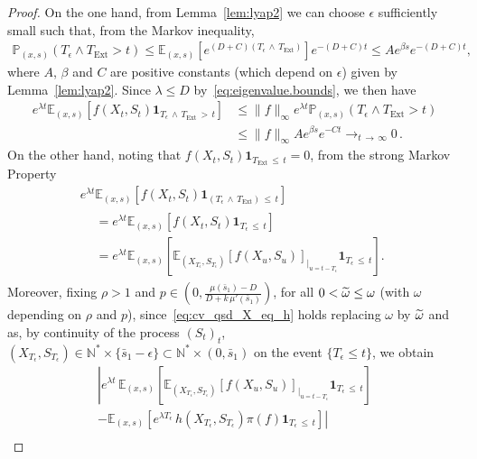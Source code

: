 \documentclass[10pt]{amsart}
\theoremstyle{definition}\newtheorem{defi}[theo]{Definition}\newtheorem{rema}[theo]{Remark}\newtheorem{exam}[theo]{Example}\newtheorem{exem}[theo]{Example}\newtheorem{nota}[theo]{Notation}
\newcommand{\PP}{\mathbb{P}}
\newcommand{\NN}{\mathbb{N}}
\newcommand{\EE}{\mathbb{E}}
\newcommand{\Text}{T_{\mathrm{Ext}}}
\newcommand{\1}{\mathbf{1}}
\let\oldtilde\tilde
\renewcommand*{\tilde}[1]{\mathchoice{\widetilde{#1}}{\widetilde{#1}}{\oldtilde{#1}}{\oldtilde{#1}}}
\begin{document}
\begin{proof}
On the one hand, from Lemma~\ref{lem:lyap2} we can choose $\epsilon$ sufficiently small such that, from the Markov inequality,
\begin{align}\label{eq:proba.T_epsilon}
\PP_{(x,s)}\left(T_\epsilon\wedge \Text >t\right)\leq \EE_{(x,s)}\left[e^{(D+C)\left(T_\epsilon\,\wedge\,\Text\right)} \right] e^{-(D+C)t} \leq A e^{\beta s} e^{-(D+C)t},
\end{align}
where $A$, $\beta$ and $C$ are positive constants (which depend on $\epsilon$) given by Lemma~\ref{lem:lyap2}. Since $\lambda \leq D$ by~\eqref{eq:eigenvalue.bounds}, we then have
\begin{align*}
e^{\lambda t}\EE_{(x,s)}\left[f(X_t,S_t)\1_{T_\epsilon\,\wedge\,\Text\,>\,t}\right] &\leq \|f \|_\infty e^{\lambda t} \PP_{(x,s)}\left(T_\epsilon\wedge \Text>t\right) \\
&\leq \|f \|_\infty A e^{\beta s} e^{-Ct} \longrightarrow_{t\,\to\,\infty} 0\,.
\end{align*}
On the other hand, noting that $f(X_t,S_t)\1_{\Text\,\leq\,t}=0$, from the strong Markov Property
\begin{multline}\label{eq:T_eps_leq_t}
e^{\lambda t}\EE_{(x,s)} \left[f(X_t,S_t)\1_{(T_\epsilon\,\wedge\,\Text)\,\leq\,t}\right]
\\
\begin{aligned}
&=e^{\lambda t}\EE_{(x,s)} \left[f(X_t,S_t)\1_{T_\epsilon\,\leq\,t}\right] \\
&= e^{\lambda t} \EE_{(x,s)} \left[
\EE_{\left(X_{T_\epsilon},S_{T_\epsilon}\right)}\left[f(X_{u},S_{u}) \right]_{\vert_{u=t-T_\epsilon}} \1_{T_\epsilon\,\leq\,t} \right].
\end{aligned}
\end{multline}
Moreover, fixing $\rho>1$ and $p\in(0,\frac{\mu(\bar s_1)-D}{D+k\,\mu'(\bar s_1)})$, for all $0<\tilde \omega\leq \omega$ (with $\omega$ depending on $\rho$ and $p$), since~\eqref{eq:cv_qsd_X_eq_h} holds replacing $\omega$ by $\tilde \omega$ and as, by continuity of the process $(S_t)_t$, $(X_{T_\epsilon},S_{T_\epsilon})\in\NN^*\times \{\bar s_1-\epsilon\}\subset \NN^*\times (0,\bar s_1)$ on the event $\{T_\epsilon\leq t\}$, we obtain
\begin{multline}\label{eq:cv.T_eps_leq_t}
 \left|e^{\lambda t}\,\EE_{(x,s)} \left[
\EE_{\left(X_{T_\epsilon},S_{T_\epsilon}\right)}\left[f\left(X_{u},S_{u}\right) \right]_{\vert_{u=t-T_\epsilon}} \1_{T_\epsilon\,\leq\,t} \right]\right.\\
-\left. \EE_{(x,s)} \left[e^{\lambda T_\epsilon} \, h\left(X_{T_\epsilon},S_{T_\epsilon}\right)\pi(f) \1_{T_\epsilon\,\leq\,t} \right] \right|\\

\end{multline}
\end{proof}
\end{document}
